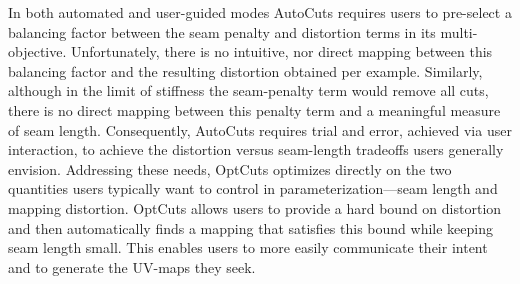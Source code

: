 In both automated and user-guided modes AutoCuts requires users to pre-select a balancing factor between the seam penalty and distortion terms in its multi-objective. Unfortunately, there is no intuitive, nor direct mapping between this balancing factor and the resulting distortion obtained per example. Similarly, although in the limit of stiffness the seam-penalty term would remove all cuts, there is no direct mapping between this penalty term and a meaningful measure of seam length. Consequently, AutoCuts requires trial and error, achieved via user interaction, to achieve the distortion versus seam-length tradeoffs users generally envision. 
%
Addressing these needs, OptCuts optimizes directly on the two quantities users typically want to control in parameterization---seam length and mapping distortion. OptCuts allows users to provide a hard bound on distortion and then automatically finds a mapping that satisfies this bound while keeping seam length small. This enables users to more easily communicate their intent and to generate the UV-maps they seek.

